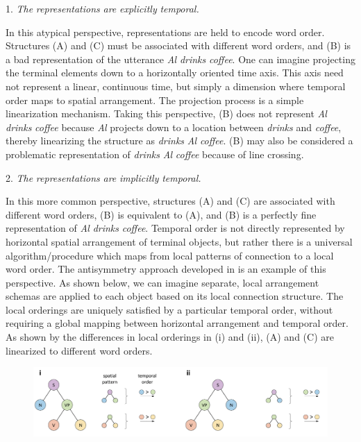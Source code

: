 1. \textit{The} \textit{representations} \textit{are} \textit{explicitly} \textit{temporal.}

  In this atypical perspective, representations are held to encode word order. Structures (A) and (C) must be associated with different word orders, and (B) is a bad representation of the utterance \textit{Al} \textit{drinks} \textit{coffee}. One can imagine projecting the terminal elements down to a horizontally oriented time axis. This axis need not represent a linear, continuous time, but simply a dimension where temporal order maps to spatial arrangement. The projection process is a simple linearization mechanism. Taking this perspective, (B) does not represent \textit{Al} \textit{drinks} \textit{coffee} because \textit{Al} projects down to a location between \textit{drinks} and \textit{coffee}, thereby linearizing the structure as \textit{drinks} \textit{Al} \textit{coffee}. (B) may also be considered a problematic representation of \textit{drinks} \textit{Al} \textit{coffee} because of line crossing.

2. \textit{The} \textit{representations} \textit{are} \textit{implicitly} \textit{temporal.}

  In this more common perspective, structures (A) and (C) are associated with different word orders, (B) is equivalent to (A), and (B) is a perfectly fine representation of \textit{Al} \textit{drinks} \textit{coffee}. Temporal order is not directly represented by horizontal spatial arrangement of terminal objects, but rather there is a universal algorithm/procedure which maps from local patterns of connection to a local word order. The antisymmetry approach developed in \citet{Kayne1994} is an example of this perspective. As shown below, we can imagine separate, local arrangement schemas are applied to each object based on its local connection structure. The local orderings are uniquely satisfied by a particular temporal order, without requiring a global mapping between horizontal arrangement and temporal order. As shown by the differences in local orderings in (i) and (ii), (A) and (C) are linearized to different word orders.

  
\begin{figure}
\includegraphics[width=\textwidth]{figures/Tilsen-img41.png}
\caption{\missingcaption}
\label{fig:}
\end{figure}
 

